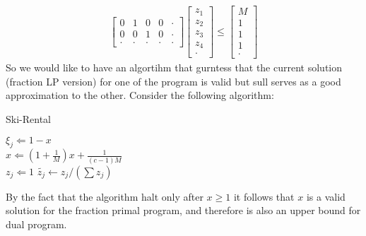 \documentclass{article}
\begin{document}
\begin{multicols*}{2}
\begin{equation*}
\begin{split}
\begin{bmatrix}
	0 & 1 & 0 & 0 & \cdot \\
	0 & 0 & 1 & 0 & \cdot \\
	\cdot & \cdot & \cdot & \cdot & \cdot
      \end{bmatrix} 
      \begin{bmatrix}
	z_{1} \\
	z_{2} \\ 
	z_{3} \\
	z_{4} \\
	\cdot 
      \end{bmatrix} \le
      \begin{bmatrix}
	M \\
	1 \\ 
	1 \\
	1 \\
	\cdot 
      \end{bmatrix}
    \end{split}
  \end{equation*}
  So we would like to have an algortihm that gurntess that the current solution (fraction LP version) for one of the program is valid but sull serves as a good approximation to the other. Consider the following algorithm:  

  \begin{algorithm}[H]
    \caption{Ski-Rental}
    \label{alg:three}
     {
       { 
	$ \xi_{j} \Leftarrow 1 - x$ \\
	$ x \Leftarrow \left( 1 + \frac{1}{M} \right) x + \frac{1}{\left( c - 1  \right) M } $ \\
	$ z_{j} \Leftarrow 1$
      }
  }
  $\tilde{z_{j}} \leftarrow z_{j} / \left( \sum{z_{j}} \right)  $ 
  \end{algorithm}
  By the fact that the algorithm halt only after $x \ge 1 $ it follows that $x$ is a valid solution for the fraction primal program, and therefore is also an upper bound for dual program. 


\end{multicols*}
\end{document}
